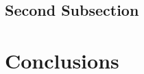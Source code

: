 \documentclass{sageep}
\begin{document}
\lipsum[2-5]


\subsection{Second Subsection}

\lipsum[5-8]

\section{Conclusions}

\lipsum[9-10]



\end{document}
